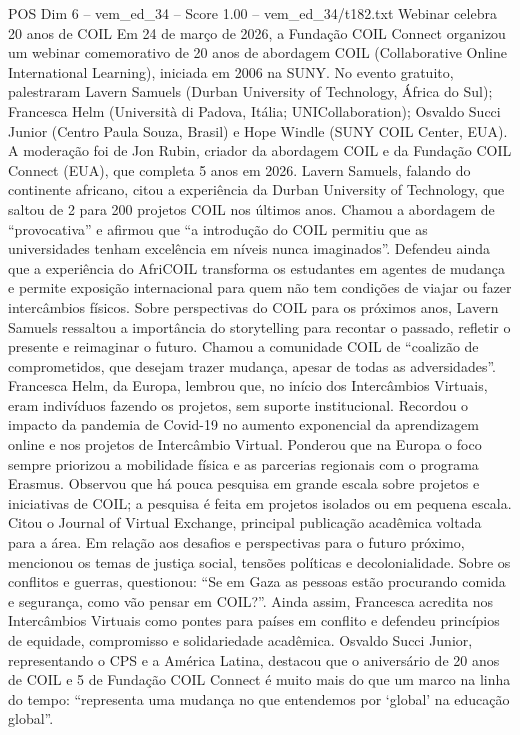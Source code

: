 \begin{textsample}{POS Dim 6 – vem\_ed\_34 – Score 1.00 – vem\_ed\_34/t182.txt}  \label{ex:f6_pos_157}
Webinar celebra 20 anos de COIL Em 24 de março de 2026, a Fundação COIL Connect organizou um webinar comemorativo de 20 anos de abordagem COIL (Collaborative Online International Learning), iniciada em 2006 na SUNY.
No evento gratuito, palestraram Lavern Samuels (Durban University of Technology, África do Sul); Francesca Helm (Università di Padova, Itália; UNICollaboration); Osvaldo Succi Junior (Centro Paula Souza, Brasil) e Hope Windle (SUNY COIL Center, EUA).
A moderação foi de Jon Rubin, criador da abordagem COIL e da Fundação COIL Connect (EUA), que completa 5 anos em 2026.
Lavern Samuels, falando do continente africano, citou a experiência da Durban University of Technology, que saltou de 2 para 200 projetos COIL nos últimos anos.
Chamou a abordagem de “provocativa” e afirmou que “a introdução do COIL permitiu que as universidades tenham excelência em níveis nunca imaginados”.
Defendeu ainda que a experiência do AfriCOIL transforma os estudantes em agentes de mudança e permite exposição internacional para quem não tem condições de viajar ou fazer intercâmbios físicos.
Sobre perspectivas do COIL para os próximos anos, Lavern Samuels ressaltou a importância do storytelling para recontar o passado, refletir o presente e reimaginar o futuro.
Chamou a comunidade COIL de “coalizão de comprometidos, que desejam trazer mudança, apesar de todas as adversidades”.
Francesca Helm, da Europa, lembrou que, no início dos Intercâmbios Virtuais, eram indivíduos fazendo os projetos, sem suporte institucional.
Recordou o impacto da pandemia de Covid-19 no aumento exponencial da aprendizagem online e nos projetos de Intercâmbio Virtual.
Ponderou que na Europa o foco sempre priorizou a mobilidade física e as parcerias regionais com o programa Erasmus.
Observou que há pouca pesquisa em grande escala sobre projetos e iniciativas de COIL; a pesquisa é feita em projetos isolados ou em pequena escala.
Citou o Journal of Virtual Exchange, principal publicação acadêmica voltada para a área.
Em relação aos desafios e perspectivas para o futuro próximo, mencionou os temas de justiça social, tensões políticas e decolonialidade.
Sobre os conflitos e guerras, questionou: “Se em Gaza as pessoas estão procurando comida e segurança, como vão pensar em COIL?”.
Ainda assim, Francesca acredita nos Intercâmbios Virtuais como pontes para países em conflito e defendeu princípios de equidade, compromisso e solidariedade acadêmica.
Osvaldo Succi Junior, representando o CPS e a América Latina, destacou que o aniversário de 20 anos de COIL e 5 de Fundação COIL Connect é muito mais do que um marco na linha do tempo: “representa uma mudança no que entendemos por ‘global’ na educação global”.

\end{textsample}
